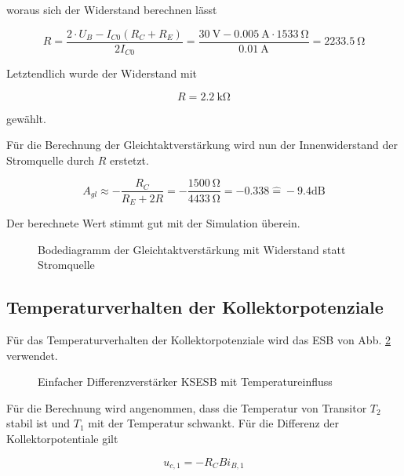 woraus sich der Widerstand berechnen lässt

\begin{equation}
    R = \frac{2\cdot U_B - I_{C0} (R_C + R_E)}{2 I_{C0} } = \frac{\SI{30}{\volt} - \SI{0.005}{\ampere} \cdot \SI{1533}{\ohm}}{\SI{0,01}{\ampere}} = \SI{2233,5}{\ohm} 
\end{equation}

Letztendlich wurde der Widerstand mit

\begin{equation}
    R = \SI{2.2}{\kilo\ohm}
\end{equation}

gewählt.

Für die Berechnung der Gleichtaktverstärkung wird nun der Innenwiderstand der Stromquelle durch $R$ erstetzt.

\begin{equation}
    A_{gl} \approx -\frac{R_C}{R_E + 2R} = -\frac{\SI{1500}{\ohm}}{\SI{4433}{\ohm}} = -0.338 \hat{ = } -9.4 \text{dB}
\end{equation}

Der berechnete Wert stimmt gut mit der Simulation überein.

\begin{figure}[H]
	\centering \small
	\scalebox{0.9}{}
	\caption{Bodediagramm der Gleichtaktverstärkung mit Widerstand statt Stromquelle}
	\label{fig_Kap5_06:Bode}
\end{figure}

\subsection{Temperaturverhalten der Kollektorpotenziale}
Für das Temperaturverhalten der Kollektorpotenziale wird das ESB von Abb. \ref{fig_Kap5_07:Temp} verwendet.

\begin{figure}[H]
	\centering
	\def\svgwidth{0.9\textwidth}
	
	\caption{Einfacher Differenzverstärker KSESB mit Temperatureinfluss} 
	\label{fig_Kap5_07:Temp} 
\end{figure}

Für die Berechnung wird angenommen, dass die Temperatur von Transitor $T_2$ stabil ist und $T_1$ mit der Temperatur schwankt.  Für die Differenz der Kollektorpotentiale gilt

\begin{equation}
    u_{c,1} = -R_C B i_{B,1}
\end{equation}

